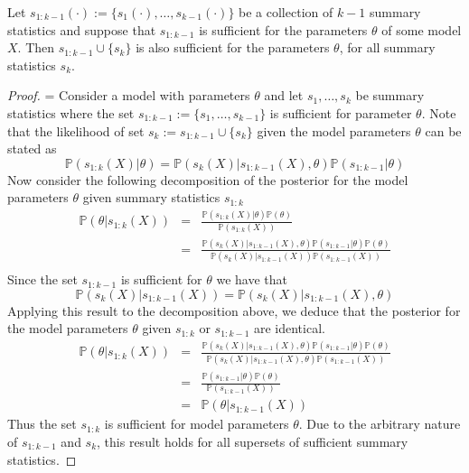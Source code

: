 \documentclass[11pt,a4paper]{article}
\newcommand*{\prob}{\mathbb{P}}
\theoremstyle{break}
\begin{document}
  \begin{box_remark}\label{the_sufficiency_of_superset}
    Let $s_{1:k-1}(\cdot):=\{s_1(\cdot),\dots,s_{k-1}(\cdot)\}$ be a collection of $k-1$ summary statistics and suppose that $s_{1:k-1}$ is sufficient for the parameters $\theta$ of some model $X$. Then $s_{1:k-1}\cup\{s_k\}$ is also sufficient for the parameters $\theta$, for all summary statistics $s_k$.
    \begin{proof}
      \everymath={\displaystyle}
      Consider a model with parameters $\theta$ and let $s_1,\dots,s_k$ be summary statistics where the set $s_{1:k-1}:=\{s_1,\dots,s_{k-1}\}$ is sufficient for parameter $\theta$. Note that the likelihood of set $s_k:=s_{1:k-1}\cup\{s_k\}$ given the model parameters $\theta$ can be stated as
      \[ \prob(s_{1:k}(X)|\theta)=\prob(s_k(X)|s_{1:k-1}(X),\theta)\prob(s_{1:k-1}|\theta) \]
      Now consider the following decomposition of the posterior for the model parameters $\theta$ given summary statistics $s_{1:k}$
      \[\begin{array}{rcl}
        \prob(\theta|s_{1:k}(X))&=&\frac{\prob(s_{1:k}(X)|\theta)\prob(\theta)}{\prob(s_{1:k}(X))}\\
        &=&\frac{\prob(s_k(X)|s_{1:k-1}(X),\theta)\prob(s_{1:k-1}|\theta)\prob(\theta)}{\prob(s_k(X)|s_{1:k-1}(X))\prob(s_{1:k-1}(X))}\\
      \end{array}\]
      Since the set $s_{1:k-1}$ is sufficient for $\theta$ we have that
      \[ \prob(s_k(X)|s_{1:k-1}(X))=\prob(s_k(X)|s_{1:k-1}(X),\theta)\]
      Applying this result to the decomposition above, we deduce that the posterior for the model parameters $\theta$ given $s_{1:k}$ or $s_{1:k-1}$ are identical.
      \[\begin{array}{rcl}
        \prob(\theta|s_{1:k}(X))&=&\frac{\prob(s_k(X)|s_{1:k-1}(X),\theta)\prob(s_{1:k-1}|\theta)\prob(\theta)}{\prob(s_k(X)|s_{1:k-1}(X),\theta)\prob(s_{1:k-1}(X))}\\
        &=&\frac{\prob(s_{1:k-1}|\theta)\prob(\theta)}{\prob(s_{1:k-1}(X))}\\
        &=&\prob(\theta|s_{1:k-1}(X))
      \end{array}\]
      Thus the set $s_{1:k}$ is sufficient for model parameters $\theta$. Due to the arbitrary nature of $s_{1:k-1}$ and $s_k$, this result holds for all supersets of sufficient summary statistics.
    \end{proof}
  \end{box_remark}
\end{document}
